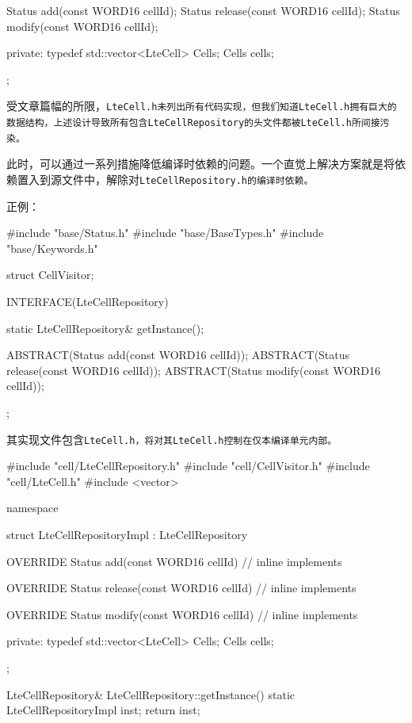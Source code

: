 \begin{content}
\begin{leftbar}
\begin{c++}
{    Status add(const WORD16 cellId);
    Status release(const WORD16 cellId);
    Status modify(const WORD16 cellId);
    
private:
    typedef std::vector<LteCell> Cells;
    Cells cells;
};
\end{c++}
\end{leftbar}

受文章篇幅的所限，\tt{LteCell.h}未列出所有代码实现，但我们知道\tt{LteCell.h}拥有巨大的数据结构，上述设计导致所有包含\tt{LteCellRepository}的头文件都被\tt{LteCell.h}所间接污染。

此时，可以通过一系列措施降低编译时依赖的问题。一个直觉上解决方案就是将依赖置入到源文件中，解除对\tt{LteCellRepository.h}的编译时依赖。

正例：
\begin{leftbar}
\begin{c++}
#include "base/Status.h"
#include "base/BaseTypes.h"
#include "base/Keywords.h"

struct CellVisitor;

INTERFACE(LteCellRepository)
{
    static LteCellRepository& getInstance();

    ABSTRACT(Status add(const WORD16 cellId));
    ABSTRACT(Status release(const WORD16 cellId));
    ABSTRACT(Status modify(const WORD16 cellId));
};
\end{c++}
\end{leftbar}

其实现文件包含\tt{LteCell.h}，将对其\tt{LteCell.h}控制在仅本编译单元内部。

\begin{leftbar}
\begin{c++}
#include "cell/LteCellRepository.h"
#include "cell/CellVisitor.h"
#include "cell/LteCell.h"
#include <vector>

namespace
{
    struct LteCellRepositoryImpl : LteCellRepository
    {
        OVERRIDE Status add(const WORD16 cellId)
        {
            // inline implements
        }

        OVERRIDE Status release(const WORD16 cellId)
        {
            // inline implements
        }

        OVERRIDE Status modify(const WORD16 cellId)
        {
            // inline implements
        }
    
    private:
        typedef std::vector<LteCell> Cells;
        Cells cells;
    };
}

LteCellRepository& LteCellRepository::getInstance()
{
    static LteCellRepositoryImpl inst;
    return inst;
}
\end{c++}
\end{leftbar}


\end{content}
